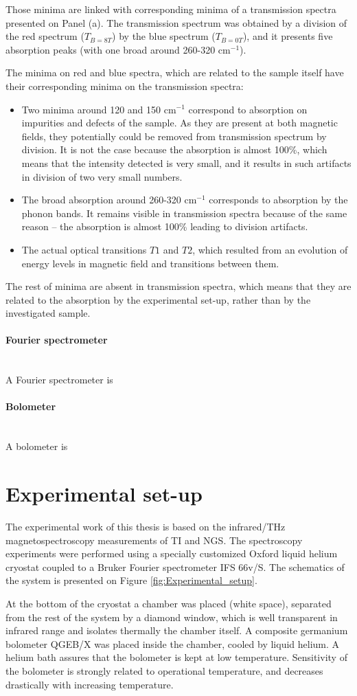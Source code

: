 \documentclass[titlepage,a4paper]{book}
\newcommand{\wciecie}{\quad\phantom{v}}
\newcommand{\myparagraph}[1]{\paragraph{#1}\mbox{}\\}
\begin{document}
Those minima are linked with corresponding minima of a transmission spectra presented on Panel (a). The transmission spectrum was obtained by a division of the red spectrum ($T_{B=8T}$) by the blue spectrum ($T_{B=0T}$), and it presents five absorption peaks (with one broad around 260-320 cm$^{-1}$). 

The minima on red and blue spectra, which are related to the sample itself have their corresponding minima on the transmission spectra:
\begin{itemize}
\item Two minima around 120 and 150 cm$^{-1}$ correspond to absorption on impurities and defects of the sample. As they are present at both magnetic fields, they potentially could be removed from transmission spectrum by division. It is not the case because the absorption is almost 100\%, which means that the intensity detected is very small, and it results in such artifacts in division of two very small numbers.
\item The broad absorption around 260-320 cm$^{-1}$ corresponds to absorption by the phonon bands. It remains visible in transmission spectra because of the same reason -- the absorption is almost 100\% leading to division artifacts.
\item The actual optical transitions $T1$ and $T2$, which resulted from an evolution of energy levels in magnetic field and transitions between them.
\end{itemize}

The rest of minima are absent in transmission spectra, which means that they are related to the absorption by the experimental set-up, rather than by the investigated sample.

\myparagraph{Fourier spectrometer}
A Fourier spectrometer is

\myparagraph{Bolometer}
A bolometer is


\section{Experimental set-up}
\wciecie
The experimental work of this thesis is based on the infrared/THz magnetospectroscopy measurements of TI and NGS. The spectroscopy experiments were performed using a specially customized Oxford liquid helium cryostat coupled to a Bruker Fourier spectrometer IFS 66v/S. The schematics of the system is presented on Figure \ref{fig:Experimental_setup}. 

At the bottom of the cryostat a chamber was placed (white space), separated from the rest of the system by a diamond window, which is well transparent in infrared range and isolates thermally the chamber itself. A composite germanium bolometer QGEB/X was placed inside the chamber, cooled by liquid helium. A helium bath assures that the bolometer is kept at low temperature. Sensitivity of the bolometer is strongly related to operational temperature, and decreases drastically with increasing temperature. 
\end{document}
